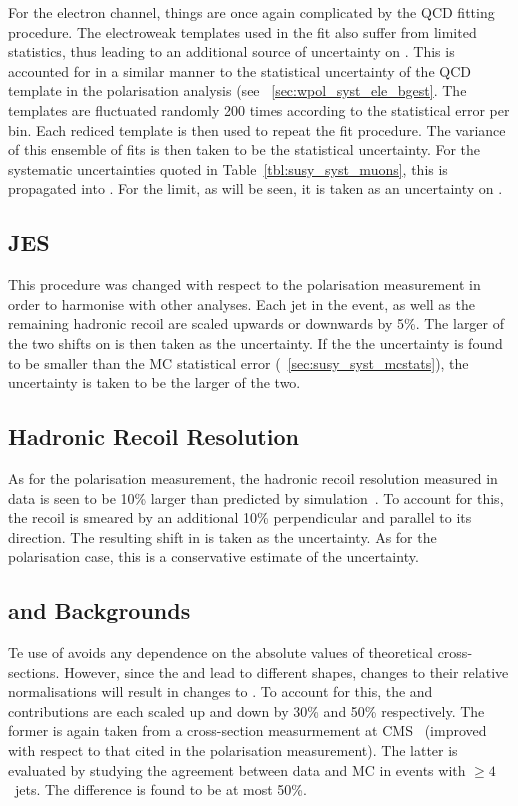 For the electron channel, things are once again complicated by the \ac{QCD}
fitting procedure. The electroweak templates used in the fit also suffer from
limited statistics, thus leading to an additional source of uncertainty on
\NControl. This is accounted for in a similar manner to the statistical
uncertainty of the \ac{QCD} template in the \PW polarisation analysis (see
\sec~\ref{sec:wpol_syst_ele_bgest}. The templates are fluctuated randomly 200
times according to the statistical error per bin. Each rediced template is then
used to repeat the fit procedure. The variance of this ensemble of fits is then
taken to be the statistical uncertainty. For the systematic uncertainties quoted
in Table~\ref{tbl:susy_syst_muons}, this is propagated into \RCS. For the limit,
as will be seen, it is taken as an uncertainty on \NControl.

\subsection{\acl{JES}}
\label{sec:susy_jes_uncertainty}
This procedure was changed with respect to the \PW polarisation measurement in
order to harmonise with other analyses. Each jet in the event, as well as the
remaining hadronic recoil are scaled upwards or downwards by 5\%. The larger of
the two shifts on \RCS is then taken as the uncertainty. If the the uncertainty
is found to be smaller than the \ac{MC} statistical error
(\sec~\ref{sec:susy_syst_mcstats}), the uncertainty is taken to be the larger
of the two.

\subsection{Hadronic Recoil Resolution}
\label{sec:susy_metres_uncertainty}
As for the \PW polarisation measurement, the hadronic recoil resolution measured
in data is seen to be 10\% larger than predicted by
simulation~\cite{cms_met_paper, cms_met_pas}. To account for this, the recoil is
smeared by an additional 10\% perpendicular and parallel to its direction. The
resulting shift in \RCS is taken as the uncertainty. As for the \PW polarisation
case, this is a conservative estimate of the uncertainty.

\subsection[\texorpdfstring{\Wjets}{W+jets} and \texorpdfstring{\ttbar}{tt}
Backgrounds]{\boldmath{\Wjets} and \boldmath{\ttbar} Backgrounds}
Te use of \RCS avoids any dependence on the absolute values of theoretical
cross-sections. However, since the \Wjets and \ttbar lead to different \LP
shapes, changes to their relative normalisations will result in changes to
\RCS. To account for this, the \ttbar and \Wjets contributions are each scaled
up and down by 30\% and 50\% respectively. The former is again taken from a
cross-section measurmement at \ac{CMS}~\cite{cms_ttbar_paper2} (improved with
respect to that cited in the \PW polarisation measurement). The latter is
evaluated by studying the agreement between data and \ac{MC} in \Zjets
events with $\geq 4$~jets. The difference is found to be at most 50\%.

